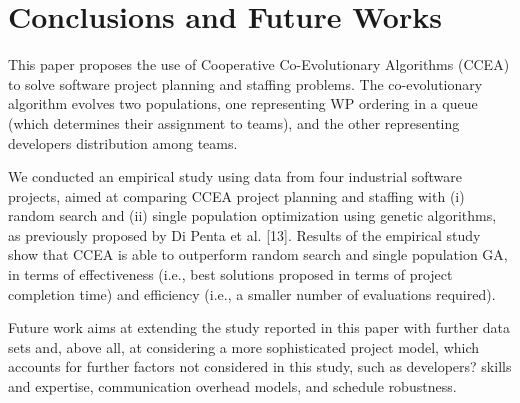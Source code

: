 %
%

\section{Conclusions and Future Works}
%
This paper proposes the use of Cooperative Co-Evolutionary Algorithms (CCEA) to solve software project planning and staffing problems.
The co-evolutionary algorithm evolves two populations, one representing WP ordering in a queue (which determines
their assignment to teams), and the other representing developers distribution among
teams.

We conducted an empirical study using data from four industrial software projects, aimed at comparing CCEA project planning and staffing with (i) random search and (ii) single population optimization using genetic algorithms, as previously proposed by Di Penta et al. [13].
Results of the empirical study show that CCEA is able to outperform random search and single population GA, in terms of effectiveness (i.e., best solutions proposed in terms of project completion time) and efficiency (i.e., a smaller number of
evaluations required).

Future work aims at extending the study reported in this paper with further data sets and, above all, at considering a more sophisticated project model, which accounts for further factors not considered in this study, such as developers? skills and expertise, communication overhead models, and schedule robustness.
